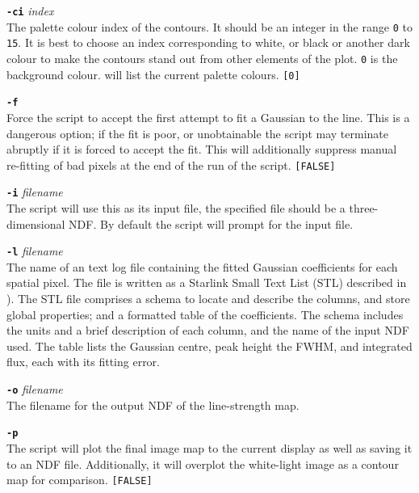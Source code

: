 \documentclass[twoside,11pt,nolof]{starlink}
\begin{document}
{{{         \sstitem
         {\bf{\tt{-ci}}} \emph{index}\\
           The palette colour index of the contours.  It should be an
           integer in the range \texttt{0} to \texttt{15}.  It is best to choose
           an index corresponding to white, or black or another dark colour
           to make the contours stand out from other elements of the plot.
           \texttt{0} is the background colour. 
           will list the current palette colours.  \texttt{[0]}

         \sstitem
         {\bf{\tt{-f}}}\\
           Force the script to accept the first attempt to fit a Gaussian to
           the line.  This is a dangerous option; if the fit is poor, or
           unobtainable the script may terminate abruptly if it is forced to
           accept the fit.  This will additionally suppress manual re-fitting
           of bad pixels at the end of the run of the script.  \texttt{[FALSE]}

         \sstitem
         {\bf{\tt{-i}}} \emph{filename}\\
           The script will use this as its input file, the specified file should
           be a three-dimensional NDF.  By default the script will prompt for the
           input file.

         \sstitem
         {\bf{\tt{-l}}} \emph{filename}\\
           The name of an text log file containing the fitted Gaussian
           coefficients for each spatial pixel.  The file is written as a
           Starlink Small Text List (STL) described in
           ).  The STL file comprises a schema to
           locate and describe the columns, and store global properties; and a
           formatted table of the coefficients.  The schema includes the units
           and a brief description of each column, and the name of the input
           NDF used.  The table lists the Gaussian centre, peak height the FWHM,
           and integrated flux, each with its fitting error.

         \sstitem
         {\bf{\tt{-o}}} \emph{filename}\\
           The filename for the output NDF of the line-strength map.

         \sstitem
         {\bf{\tt{-p}}}\\
           The script will plot the final image map to the current display
           as well as saving it to an NDF file.  Additionally, it will overplot
           the white-light image as a contour map for comparison. \texttt{[FALSE]}

}}}
\end{document}
